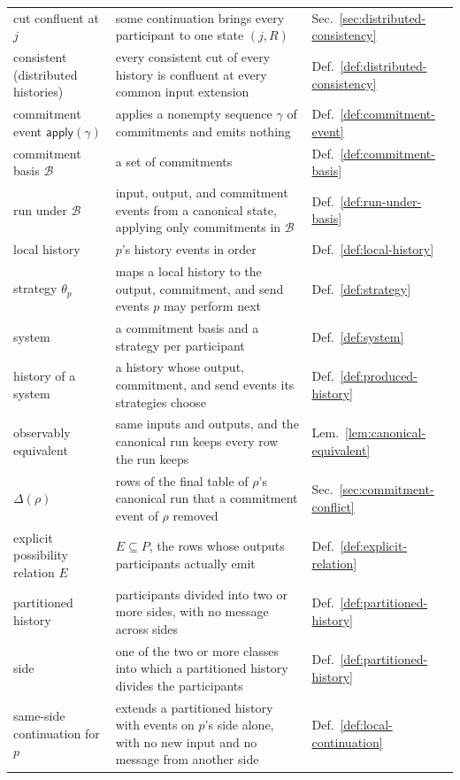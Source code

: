 \documentclass[sigconf]{cidr-2027}
\theoremstyle{remark}
\newcommand{\commitment}{commitment\xspace}
\newcommand{\commitments}{commitments\xspace}
\newcommand{\indesc}{input extension\xspace} %
\begin{document}
{\begin{tabular}{@{}>{\raggedright\arraybackslash}p{}>{\raggedright\arraybackslash}p{}>{\raggedright\arraybackslash}p{}@{}}
  cut confluent at $j$ & some continuation brings every participant to one state $(j,R)$ & Sec.~\ref{sec:distributed-consistency}\\
  consistent (distributed histories) & every consistent cut of every history is confluent at every common \indesc & Def.~\ref{def:distributed-consistency}\\
  \commitment event $\mathsf{apply}(\gamma)$ & applies a nonempty sequence $\gamma$ of \commitments and emits nothing & Def.~\ref{def:commitment-event}\\
  \commitment basis $\mathcal B$ & a set of \commitments & Def.~\ref{def:commitment-basis}\\
  run under $\mathcal B$ & input, output, and \commitment events from a canonical state, applying only \commitments in $\mathcal B$ & Def.~\ref{def:run-under-basis}\\
  local history & $p$'s history events in order & Def.~\ref{def:local-history}\\
  strategy $\theta_p$ & maps a local history to the output, \commitment, and send events $p$ may perform next & Def.~\ref{def:strategy}\\
  system & a \commitment basis and a strategy per participant & Def.~\ref{def:system}\\
  history of a system & a history whose output, \commitment, and send events its strategies choose & Def.~\ref{def:produced-history}\\
  observably equivalent & same inputs and outputs, and the canonical run keeps every row the run keeps & Lem.~\ref{lem:canonical-equivalent}\\
  $\Delta(\rho)$ & rows of the final table of $\rho$'s canonical run that a \commitment event of $\rho$ removed & Sec.~\ref{sec:commitment-conflict}\\
  explicit possibility relation $E$ & $E\subseteq P$, the rows whose outputs participants actually emit & Def.~\ref{def:explicit-relation}\\
  partitioned history & participants divided into two or more sides, with no message across sides & Def.~\ref{def:partitioned-history}\\
  side & one of the two or more classes into which a partitioned history divides the participants & Def.~\ref{def:partitioned-history}\\
  same-side continuation for $p$ & extends a partitioned history with events on $p$'s side alone, with no new input and no message from another side & Def.~\ref{def:local-continuation}\\

\end{tabular}}
\end{document}

